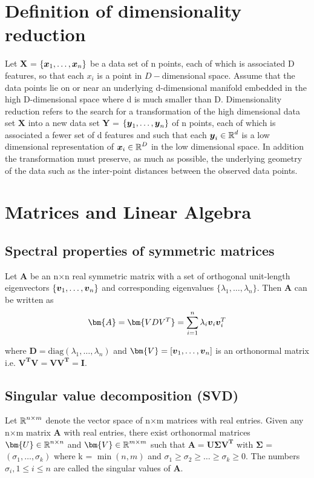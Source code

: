 
\section{Definition of dimensionality reduction}
Let \textbf{X} = $\displaystyle \{\boldsymbol{x}_{1}, \ldots , \boldsymbol{x}_{n} \}$
be a data set of n points, each of which is associated D features, so that each $x_{i}$ is a point in $D-$dimensional space. Assume that the data points lie on or near an underlying d-dimensional manifold embedded in the high D-dimensional space where d is much smaller than D. Dimensionality reduction refers to the search for a  transformation of the high dimensional data set
$\textbf{X}$ into a new data set \textbf{Y} = $\displaystyle \{ \boldsymbol{y}_{1}, \ldots, \boldsymbol{y}_{n} \}$  of n points, each of which is associated
a fewer set of d features and such that each $\boldsymbol{y}_{i} \in \operatorname{\mathbb{R}}^{d}$ is a low dimensional representation of $\boldsymbol{x}_{i} \in \operatorname{\mathbb{R}}^{D}$ in the low dimensional space. In addition the transformation must preserve, as much as possible, the underlying geometry of the data such as the inter-point distances between the observed data points.


\section{Matrices and Linear Algebra}
\subsection{Spectral properties of symmetric matrices}
Let \textbf{A} be an n$\times$n real symmetric matrix with a set of 
orthogonal unit-length eigenvectors  $\{ \boldsymbol{v}_{1}, \ldots, \boldsymbol{v}_{n} \}$ and corresponding eigenvalues $\{\lambda_{1}, \ldots, \lambda_{n} \}.$ 
Then \textbf{A} can be written as 
\[ 
\bm{A} = \bm{VDV^{T}} = 
\sum_{i=1}^{n} \lambda_{i} \vect{v}_{i} \vect{v}_{i}^{T} 
\]

where $\bm{D} = \text{diag}(\lambda_{1}, \ldots, \lambda_{n})$ and  $ \bm{V} = [\vect{v}_{1}, \ldots, \vect{v}_{n}]$ is an orthonormal matrix i.e.
$\bm{V^{T}V  = VV^{T} = I}.$

\subsection{Singular value decomposition (SVD)}
Let $\operatorname{\mathbb{R}}^{n \times m}$ denote the vector space of n$\times$m matrices with real entries. Given any n$\times$m matrix $\bm{A}$ with real entries, there exist orthonormal matrices $\bm{U} \in \R^{n \times n}$ and $\bm{V} \in \R^{m \times m}$ such that 
$\bm{\displaystyle A = U \Sigma V^{T}}$ with $\bm{\Sigma}$ = $(\sigma_{1}, \ldots, \sigma_{k})$ where  k = $\min(n, m)$ and
 $\sigma_{1} \geq \sigma_{2} \geq \ldots \geq \sigma_{k} \geq 0$.
The numbers $\sigma_{i}, 1\leq i\leq n$ are called the singular values of $\bm{A}$. 

